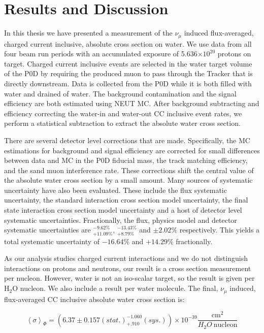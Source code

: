 \section{Results and Discussion}
\label{sec:results}

In this thesis we have presented a measurement of the $\nu_\mu$ induced flux-averaged, charged current inclusive, absolute cross section on water. We use data from all four beam run periods with an accumulated exposure of 5.636$\times 10^{20}$ protons on target. Charged current inclusive events are selected in the water target volume of the P0D by requiring the produced muon to pass through the Tracker that is directly downstream. Data is collected from the P0D while it is both filled with water and drained of water. The background contamination and the signal efficiency are both estimated using NEUT MC. After background subtracting and efficiency correcting the water-in and water-out CC inclusive event rates, we perform a statistical subtraction to extract the absolute water cross section.

There are several detector level corrections that are made. Specifically, the MC estimations for background and signal efficiency are corrected for small differences between data and MC in the P0D fiducial mass, the track matching efficiency, and the sand muon interference rate. These corrections shift the central value of the absolute water cross section by a small amount. Many sources of systematic uncertainty have also been evaluated. These include the flux systematic uncertainty, the standard interaction cross section model uncertainty, the final state interaction cross section model uncertainty and a host of detector level systematic uncertainties. Fractionally, the flux, physics model and detector systematic uncertainties are $^{-9.62\%}_{+11.09\%}$, $^{-13.43\%}_{+8.79\%}$ and $\pm 2.02\%$ respectively. This yields a total systematic uncertainty of $-16.64\%$ and $+14.29\%$ fractionally.

As our analysis studies charged current interactions and we do not distinguish interactions on protons and neutrons, our result is a cross section measurement per nucleon. However, water is not an iso-scalar target, so the result is given per H$_2$O nucleon. We also include a result per water molecule. The final, $\nu_\mu$ induced, flux-averaged CC inclusive absolute water cross section is:

\begin{equation}
\left<\sigma\right>_\Phi = (6.37 \pm 0.157 (stat.) ^{-1.060}_{+.910} (sys.))\times 10^{-39} \frac{\text{cm}^2}{H_2O\:\text{nucleon}}
\end{equation}

